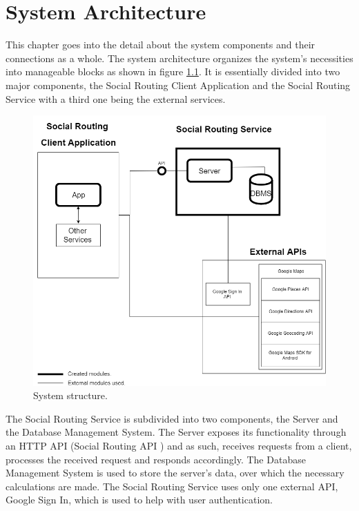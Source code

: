 \chapter{System Architecture}     
        This chapter goes into the detail about the system components and their connections as a whole.
        The system architecture organizes the system's necessities into manageable blocks as shown in figure \ref{fig:systemstructure}.
        It is essentially divided into two major components, the Social Routing Client Application \cite{clientapplicationdocs} and the Social Routing Service with a third one being the external services.
        
        \vfill
        \begin{figure}[h]            
            \includegraphics[width=\textwidth]{images/project-structure/system-structure.PNG}
            \caption{System structure.}
            \label{fig:systemstructure}
        \end{figure} 

        The Social Routing Service is subdivided into two components, the Server and the Database Management System\cite{dbmsdefinition}. The Server exposes its
        functionality through an HTTP\cite{httponlinedocs} API\cite{api} (Social Routing API \cite{apidocs}) and as such, receives requests from a client, processes the received request and responds accordingly.
        The Database Management System is used to store the server's data, over which the necessary calculations are made. 
        The Social Routing Service uses only one external API, Google Sign In\cite{googlesignindocs}, which is used to help with user authentication.

